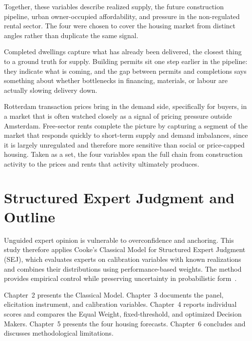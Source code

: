Together, these variables describe realized supply, the future construction pipeline, urban owner-occupied affordability, and pressure in the non-regulated rental sector. The four were chosen to cover the housing market from distinct angles rather than duplicate the same signal.

Completed dwellings capture what has already been delivered, the closest thing to a ground truth for supply. Building permits sit one step earlier in the pipeline: they indicate what is coming, and the gap between permits and completions says something about whether bottlenecks in financing, materials, or labour are actually slowing delivery down.

Rotterdam transaction prices bring in the demand side, specifically for buyers, in a market that is often watched closely as a signal of pricing pressure outside Amsterdam. Free-sector rents complete the picture by capturing a segment of the market that responds quickly to short-term supply and demand imbalances, since it is largely unregulated and therefore more sensitive than social or price-capped housing. Taken as a set, the four variables span the full chain from construction activity to the prices and rents that activity ultimately produces.

\section{Structured Expert Judgment and Outline}
\label{sec:sej_outline}

Unguided expert opinion is vulnerable to overconfidence and anchoring. This study therefore applies Cooke's Classical Model for Structured Expert Judgment (SEJ), which evaluates experts on calibration variables with known realizations and combines their distributions using performance-based weights. The method provides empirical control while preserving uncertainty in probabilistic form~\cite{cooke1991experts,cookeGoossens2008}.

Chapter~2 presents the Classical Model. Chapter~3 documents the panel, elicitation instrument, and calibration variables. Chapter~4 reports individual scores and compares the Equal Weight, fixed-threshold, and optimized Decision Makers. Chapter~5 presents the four housing forecasts. Chapter~6 concludes and discusses methodological limitations.

